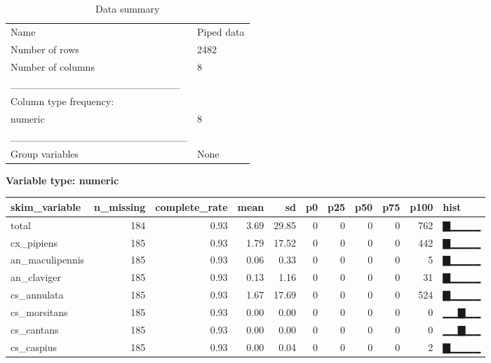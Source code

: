 \documentclass[]{article}
\newenvironment{Shaded}{\begin{snugshade}}{\end{snugshade}}
\newcommand{\CommentTok}[1]{\textcolor[rgb]{0.56,0.35,0.01}{\textit{#1}}}
\newcommand{\DataTypeTok}[1]{\textcolor[rgb]{0.13,0.29,0.53}{#1}}
\newcommand{\KeywordTok}[1]{\textcolor[rgb]{0.13,0.29,0.53}{\textbf{#1}}}
\newcommand{\NormalTok}[1]{#1}
\newcommand{\OperatorTok}[1]{\textcolor[rgb]{0.81,0.36,0.00}{\textbf{#1}}}
\newcommand{\StringTok}[1]{\textcolor[rgb]{0.31,0.60,0.02}{#1}}
\begin{document}
\begin{Shaded}
\end{Shaded}

\begin{longtable}[]{@{}ll@{}}
\caption{Data summary}\tabularnewline
\toprule
\endhead
Name & Piped data\tabularnewline
Number of rows & 2482\tabularnewline
Number of columns & 8\tabularnewline
\_\_\_\_\_\_\_\_\_\_\_\_\_\_\_\_\_\_\_\_\_\_\_ &\tabularnewline
Column type frequency: &\tabularnewline
numeric & 8\tabularnewline
\_\_\_\_\_\_\_\_\_\_\_\_\_\_\_\_\_\_\_\_\_\_\_\_ &\tabularnewline
Group variables & None\tabularnewline
\bottomrule
\end{longtable}

\textbf{Variable type: numeric}

\begin{longtable}[]{@{}lrrrrrrrrrl@{}}
\toprule
skim\_variable & n\_missing & complete\_rate & mean & sd & p0 & p25 &
p50 & p75 & p100 & hist\tabularnewline
\midrule
\endhead
total & 184 & 0.93 & 3.69 & 29.85 & 0 & 0 & 0 & 0 & 762 &
▇▁▁▁▁\tabularnewline
cx\_pipiens & 185 & 0.93 & 1.79 & 17.52 & 0 & 0 & 0 & 0 & 442 &
▇▁▁▁▁\tabularnewline
an\_maculipennis & 185 & 0.93 & 0.06 & 0.33 & 0 & 0 & 0 & 0 & 5 &
▇▁▁▁▁\tabularnewline
an\_claviger & 185 & 0.93 & 0.13 & 1.16 & 0 & 0 & 0 & 0 & 31 &
▇▁▁▁▁\tabularnewline
cs\_annulata & 185 & 0.93 & 1.67 & 17.69 & 0 & 0 & 0 & 0 & 524 &
▇▁▁▁▁\tabularnewline
cs\_morsitans & 185 & 0.93 & 0.00 & 0.00 & 0 & 0 & 0 & 0 & 0 &
▁▁▇▁▁\tabularnewline
cs\_cantans & 185 & 0.93 & 0.00 & 0.00 & 0 & 0 & 0 & 0 & 0 &
▁▁▇▁▁\tabularnewline
cs\_caspius & 185 & 0.93 & 0.00 & 0.04 & 0 & 0 & 0 & 0 & 2 &
▇▁▁▁▁\tabularnewline
\bottomrule
\end{longtable}
\end{document}
